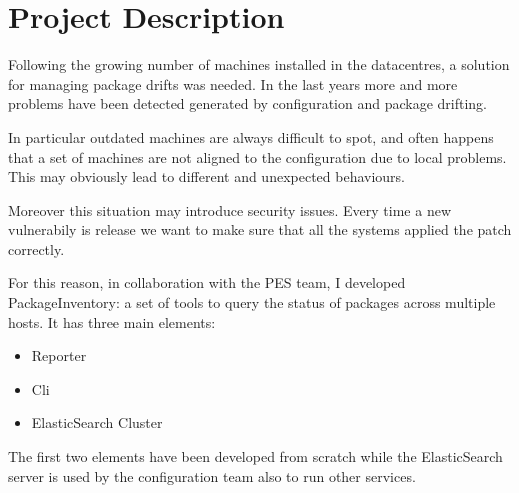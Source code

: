 \section{Project Description}

Following the growing number of machines installed in the datacentres,
a solution for managing package drifts was needed. In the last years more
and more problems have been detected generated by configuration and
package drifting.

In particular outdated machines are always difficult to spot, and often
happens that a set of machines are not aligned to the configuration due to
local problems. This may obviously lead to different and unexpected
behaviours.

Moreover this situation may introduce security issues. Every time a new
vulnerabily is release we want to make sure that all the systems applied
the patch correctly.

For this reason, in collaboration with the PES team, I developed
PackageInventory: a set of tools to query the status of packages across
multiple hosts. It has three main elements:

\begin{itemize}
  \item Reporter
  \item Cli
  \item ElasticSearch Cluster
\end{itemize}

The first two elements have been developed from scratch while the
ElasticSearch server is used by the configuration team also to run other
services.
